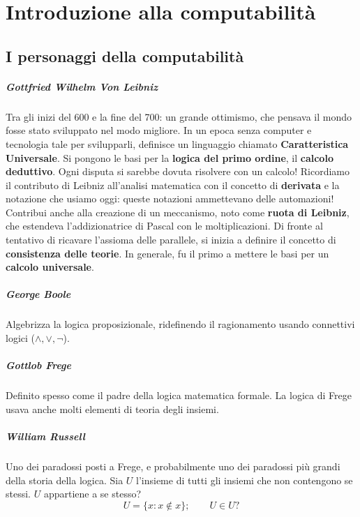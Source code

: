 \chapter{Introduzione alla computabilità}
	
	\section{I personaggi della computabilità}
	
	\paragraph{Gottfried Wilhelm Von Leibniz} Tra gli inizi del 600 e la fine del 700: un grande ottimismo, che pensava il mondo fosse stato sviluppato nel modo migliore. In un epoca senza computer e tecnologia tale per svilupparli, definisce un linguaggio chiamato \textbf{Caratteristica Universale}. Si pongono le basi per la \textbf{logica del primo ordine}, il \textbf{calcolo deduttivo}. Ogni disputa si sarebbe dovuta risolvere con un calcolo! Ricordiamo il contributo di Leibniz all'analisi matematica con il concetto di \textbf{derivata} e la notazione che usiamo oggi: queste notazioni ammettevano delle automazioni! Contribui anche alla creazione di un meccanismo, noto come \textbf{ruota di Leibniz}, che estendeva l'addizionatrice di Pascal con le moltiplicazioni. Di fronte al tentativo di ricavare l'assioma delle parallele, si inizia a definire il concetto di \textbf{consistenza delle teorie}. In generale, fu il primo a mettere le basi per un \textbf{calcolo universale}. 
	
	\paragraph{George Boole} Algebrizza la logica proposizionale, ridefinendo il ragionamento usando connettivi logici ($\land, \lor, \lnot$).
	
	\paragraph{Gottlob Frege} Definito spesso come il padre della logica matematica formale. La logica di Frege usava anche molti elementi di teoria degli insiemi.
	
	\paragraph{William Russell} Uno dei paradossi posti a Frege, e probabilmente uno dei paradossi più grandi della storia della logica.
	Sia $U$ l'insieme di tutti gli insiemi che non contengono se stessi. $U$ appartiene a se stesso?
	$$
	U = \{x : x \notin x\}; \qquad U \in U ?
	$$
	
